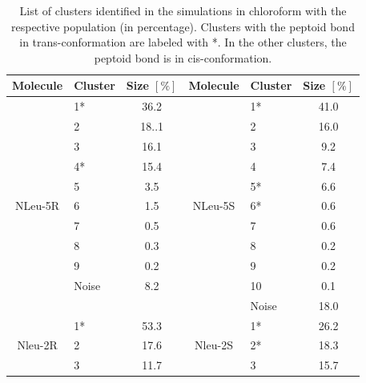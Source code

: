 \begin{table}[h!]
\center
\caption{List  of  clusters  identified  in  the  simulations  in  chloroform  with  the  respective 
population  (in  percentage).  Clusters  with  the  peptoid  bond  in  trans-conformation  are 
labeled with *. In the other clusters, the peptoid bond is in cis-conformation.}
\label{tab:SIClusterTransCHCL3}
  \begin{adjustbox}{max width=\textwidth}
\begin{tabular}{c|lc||c|lc}
Molecule                  & Cluster & Size $[\%]$ & Molecule                  & Cluster & Size $[\%]$ \\
\hline
\multirow{11}{*}{NLeu-5R} & 1*      & 36.2        & \multirow{11}{*}{NLeu-5S} & 1*      & 41.0        \\
                          & 2       & 18..1       &                           & 2       & 16.0        \\
                          & 3       & 16.1        &                           & 3       & 9.2         \\
                          & 4*      & 15.4        &                           & 4       & 7.4         \\
                          & 5       & 3.5         &                           & 5*      & 6.6         \\
                          & 6       & 1.5         &                           & 6*      & 0.6         \\
                          & 7       & 0.5         &                           & 7       & 0.6         \\
                          & 8       & 0.3         &                           & 8       & 0.2         \\
                          & 9       & 0.2         &                           & 9       & 0.2         \\
                          & Noise   & 8.2         &                           & 10      & 0.1         \\
                          &         &             &                           & Noise   & 18.0        \\
\hline
\multirow{6}{*}{Nleu-2R}  & 1*      & 53.3        & \multirow{13}{*}{Nleu-2S} & 1*      & 26.2        \\
                          & 2       & 17.6        &                           & 2*      & 18.3        \\
                          & 3       & 11.7        &                           & 3       & 15.7        \\

\end{tabular}
\end{adjustbox}
\end{table}
